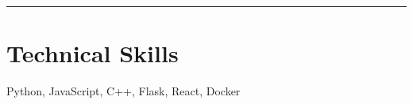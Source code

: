 \documentclass[10pt,a4paper,hidelinks]{article}
\makeatletter
\newenvironment{indentsection}[1]%
{\begin{list}{}%
	{\setlength{\leftmargin}{#1}}%
	\item[]%
}
{\end{list}}
\newcommand{\headerrow}[2]
{\begin{tabular*}{\linewidth}{l@{\extracolsep{\fill}}r}
	#1 &
	#2 \\
\end{tabular*}}
\makeatother
\begin{document}
%
%
%	
%




{\color{IFMediumGreen} \hrule}
\vspace{-0.3em}
{\color{IFDarkGreen}\section*{Technical Skills}}

\begin{indentsection}{\parindent}
\begin{description*}
    Python, JavaScript, C++, Flask, React, Docker
\end{description*}
\end{indentsection}
\end{document}

